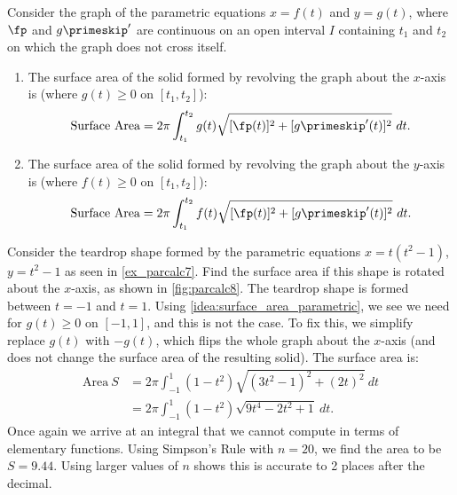 \begin{keyidea}\label{idea:surface_area_parametric}
Consider the graph of the parametric equations $x=f(t)$ and $y=g(t)$, where $\fp$ and $g\primeskip'$ are continuous on an open interval $I$ containing $t_1$ and $t_2$ on which the graph does not cross itself.
\begin{enumerate}
	\item	The surface area of the solid formed by revolving the graph about the $x$-axis is (where $g(t)\geq0$ on $[t_1,t_2]$):
\[
\text{Surface Area}
= 2\pi\int_{t_1}^{t_2} g(t)\sqrt{[\fp(t)]^2+[g\primeskip'(t)]^2}\ dt.
\]
	
	\item	The surface area of the solid formed by revolving the graph about the $y$-axis is (where $f(t)\geq0$ on $[t_1,t_2]$):
\[
\text{Surface Area}
= 2\pi\int_{t_1}^{t_2} f(t)\sqrt{[\fp(t)]^2+[g\primeskip'(t)]^2}\ dt.
\]
\end{enumerate}
\end{keyidea}


\begin{example}\label{ex_parcalc8}
Consider the teardrop shape formed by the parametric equations $x=t(t^2-1)$, $y=t^2-1$ as seen in \autoref{ex_parcalc7}. Find the surface area if this shape is rotated about the $x$-axis, as shown in \autoref{fig:parcalc8}.
\solution
The teardrop shape is formed between $t=-1$ and $t=1$. Using \autoref{idea:surface_area_parametric}, we see we need for $g(t)\geq 0$ on $[-1,1]$, and this is not the case. To fix this, we simplify replace $g(t)$ with $-g(t)$, which flips the whole graph about the $x$-axis (and does not change the surface area of the resulting solid). The surface area is: 
\begin{align*}
\text{Area}\ S &= 2\pi\int_{-1}^1 (1-t^2)\sqrt{(3t^2-1)^2+(2t)^2}\ dt\\
		&=	2\pi\int_{-1}^1 (1-t^2)\sqrt{9t^4-2t^2+1} \ dt.
		\end{align*}
Once again we arrive at an integral that we cannot compute in terms of elementary functions. Using Simpson's Rule with $n=20$, we find the area to be $S=9.44$. Using larger values of $n$ shows this is accurate to 2 places after the decimal.
\end{example}

